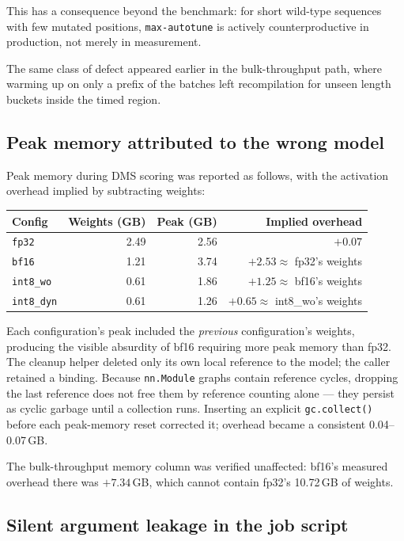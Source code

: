 \documentclass[11pt]{article}
\newcommand{\cfg}[1]{\texttt{#1}}
\begin{document}
This has a consequence beyond the benchmark: for short wild-type sequences with
few mutated positions, \texttt{max-autotune} is actively counterproductive in
production, not merely in measurement.

The same class of defect appeared earlier in the bulk-throughput path, where
warming up on only a prefix of the batches left recompilation for unseen length
buckets inside the timed region.

\subsection{Peak memory attributed to the wrong model}

Peak memory during DMS scoring was reported as follows, with the activation
overhead implied by subtracting weights:

\begin{table}[htb]
\centering
\small
\begin{tabular}{lrrr}
\toprule
Config & Weights (GB) & Peak (GB) & Implied overhead \\
\midrule
\cfg{fp32}      & 2.49 & 2.56 & $+0.07$ \\
\cfg{bf16}      & 1.21 & 3.74 & $+2.53 \approx$ fp32's weights \\
\cfg{int8\_wo}  & 0.61 & 1.86 & $+1.25 \approx$ bf16's weights \\
\cfg{int8\_dyn} & 0.61 & 1.26 & $+0.65 \approx$ int8\_wo's weights \\
\bottomrule
\end{tabular}
\end{table}

Each configuration's peak included the \emph{previous} configuration's weights,
producing the visible absurdity of bf16 requiring more peak memory than fp32.
The cleanup helper deleted only its own local reference to the model; the caller
retained a binding. Because \texttt{nn.Module} graphs contain reference cycles,
dropping the last reference does not free them by reference counting alone ---
they persist as cyclic garbage until a collection runs. Inserting an explicit
\texttt{gc.collect()} before each peak-memory reset corrected it; overhead
became a consistent 0.04--0.07\,GB.

The bulk-throughput memory column was verified unaffected: bf16's measured
overhead there was $+7.34$\,GB, which cannot contain fp32's 10.72\,GB of
weights.

\subsection{Silent argument leakage in the job script}
\end{document}
